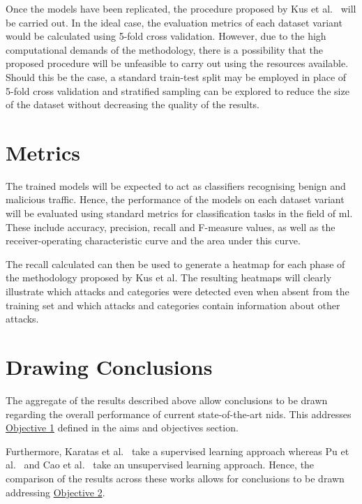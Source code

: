 Once the models have been replicated, the procedure proposed by Kus et
al.~\cite{Kus} will be carried out. In the ideal case, the evaluation metrics
of each dataset variant would be calculated using 5-fold cross validation.
However, due to the high computational demands of the methodology, there is a
possibility that the proposed procedure will be unfeasible to carry out using
the resources available. Should this be the case, a standard train-test split
may be employed in place of 5-fold cross validation and stratified sampling can
be explored to reduce the size of the dataset without decreasing the quality of
the results.

\section{Metrics}%
\label{sec:metrics}

The trained models will be expected to act as classifiers recognising benign
and malicious traffic. Hence, the performance of the models on each dataset
variant will be evaluated using standard metrics for classification tasks in
the field of \gls{ml}. These include accuracy, precision, recall and F-measure
values, as well as the receiver-operating characteristic curve and the area
under this curve.~\cite{metrics}

The recall calculated can then be used to generate a heatmap for each phase of
the methodology proposed by Kus et al. The resulting heatmaps will clearly
illustrate which attacks and categories were detected even when absent from the
training set and which attacks and categories contain information about other
attacks.

\section{Drawing Conclusions}%
\label{sec:conclusions}

The aggregate of the results described above allow conclusions to be drawn
regarding the overall performance of current state-of-the-art \gls{nids}. This
addresses \hyperlink{obj}{Objective 1} defined in the aims and objectives
section.

Furthermore, Karatas et al.~\cite{Karatas} take a supervised learning approach
whereas Pu et al.~\cite{Pu} and Cao et al.~\cite{Cao} take an unsupervised
learning approach. Hence, the comparison of the results across these works
allows for conclusions to be drawn addressing \hyperlink{obj}{Objective 2}.
